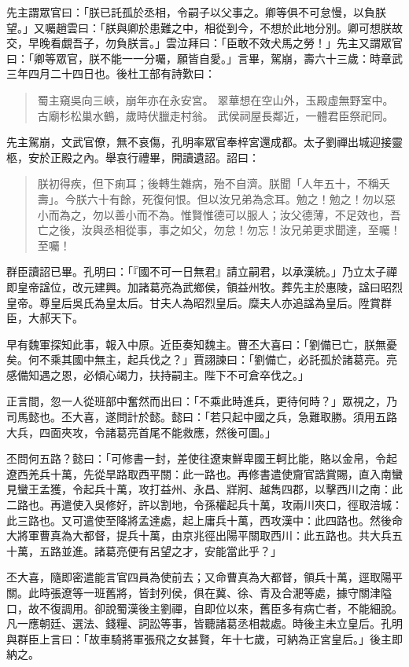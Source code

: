 先主謂眾官曰：「朕已託孤於丞相，令嗣子以父事之。卿等俱不可怠慢，以負朕望。」又囑趙雲曰：「朕與卿於患難之中，相從到今，不想於此地分別。卿可想朕故交，早晚看覷吾子，勿負朕言。」雲泣拜曰：「臣敢不效犬馬之勞！」先主又謂眾官曰：「卿等眾官，朕不能一一分囑，願皆自愛。」言畢，駕崩，壽六十三歲：時章武三年四月二十四日也。後杜工部有詩歎曰：

\begin{quote}
蜀主窺吳向三峽，崩年亦在永安宮。
翠華想在空山外，玉殿虛無野室中。
古廟杉松巢水鶴，歲時伏臘走村翁。
武侯祠屋長鄰近，一體君臣祭祀同。
\end{quote}

先主駕崩，文武官僚，無不哀傷，孔明率眾官奉梓宮還成都。太子劉禪出城迎接靈柩，安於正殿之內。舉哀行禮畢，開讀遺詔。詔曰：

\begin{quote}
朕初得疾，但下痢耳；後轉生雜病，殆不自濟。朕聞「人年五十，不稱夭壽」。今朕六十有餘，死復何恨。但以汝兄弟為念耳。勉之！勉之！勿以惡小而為之，勿以善小而不為。惟賢惟德可以服人；汝父德薄，不足效也，吾亡之後，汝與丞相從事，事之如父，勿怠！勿忘！汝兄弟更求聞達，至囑！至囑！
\end{quote}

群臣讀詔已畢。孔明曰：「『國不可一日無君』請立嗣君，以承漢統。」乃立太子禪即皇帝諡位，改元建興。加諸葛亮為武鄉侯，領益州牧。葬先主於惠陵，諡曰昭烈皇帝。尊皇后吳氏為皇太后。甘夫人為昭烈皇后。糜夫人亦追諡為皇后。陞賞群臣，大郝天下。

早有魏軍探知此事，報入中原。近臣奏知魏主。曹丕大喜曰：「劉備已亡，朕無憂矣。何不乘其國中無主，起兵伐之？」賈詡諫曰：「劉備亡，必託孤於諸葛亮。亮感備知遇之恩，必傾心竭力，扶持嗣主。陛下不可倉卒伐之。」

正言間，忽一人從班部中奮然而出曰：「不乘此時進兵，更待何時？」眾視之，乃司馬懿也。丕大喜，遂問計於懿。懿曰：「若只起中國之兵，急難取勝。須用五路大兵，四面夾攻，令諸葛亮首尾不能救應，然後可圖。」

丕問何五路？懿曰：「可修書一封，差使往遼東鮮卑國王軻比能，賂以金帛，令起遼西羌兵十萬，先從旱路取西平關：此一路也。再修書遣使齎官誥賞賜，直入南蠻見蠻王孟獲，令起兵十萬，攻打益州、永昌、牂牁、越雋四郡，以擊西川之南：此二路也。再遣使入吳修好，許以割地，令孫權起兵十萬，攻兩川夾口，徑取涪城：此三路也。又可遣使至降將孟達處，起上庸兵十萬，西攻漢中：此四路也。然後命大將軍曹真為大都督，提兵十萬，由京兆徑出陽平關取西川：此五路也。共大兵五十萬，五路並進。諸葛亮便有呂望之才，安能當此乎？」

丕大喜，隨即密遣能言官四員為使前去；又命曹真為大都督，領兵十萬，逕取陽平關。此時張遼等一班舊將，皆封列侯，俱在冀、徐、青及合淝等處，據守關津隘口，故不復調用。卻說蜀漢後主劉禪，自即位以來，舊臣多有病亡者，不能細說。凡一應朝廷、選法、錢糧、詞訟等事，皆聽諸葛丞相裁處。時後主未立皇后。孔明與群臣上言曰：「故車騎將軍張飛之女甚賢，年十七歲，可納為正宮皇后。」後主即納之。

